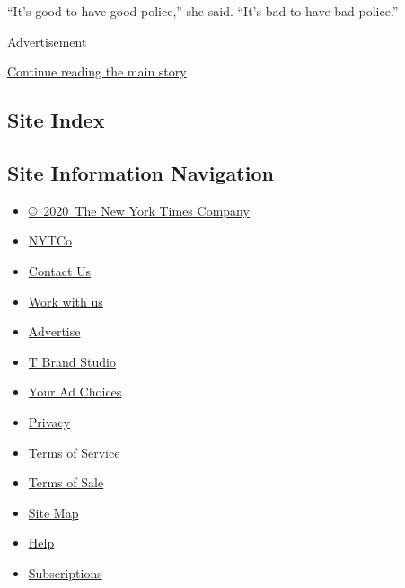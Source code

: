 ``It's good to have good police,'' she said. ``It's bad to have bad
police.''

Advertisement

\protect\hyperlink{after-bottom}{Continue reading the main story}

\hypertarget{site-index}{%
\subsection{Site Index}\label{site-index}}

\hypertarget{site-information-navigation}{%
\subsection{Site Information
Navigation}\label{site-information-navigation}}

\begin{itemize}
\tightlist
\item
  \href{https://help.nytimes3xbfgragh.onion/hc/en-us/articles/115014792127-Copyright-notice}{©~2020~The
  New York Times Company}
\end{itemize}

\begin{itemize}
\tightlist
\item
  \href{https://www.nytco.com/}{NYTCo}
\item
  \href{https://help.nytimes3xbfgragh.onion/hc/en-us/articles/115015385887-Contact-Us}{Contact
  Us}
\item
  \href{https://www.nytco.com/careers/}{Work with us}
\item
  \href{https://nytmediakit.com/}{Advertise}
\item
  \href{http://www.tbrandstudio.com/}{T Brand Studio}
\item
  \href{https://www.nytimes3xbfgragh.onion/privacy/cookie-policy\#how-do-i-manage-trackers}{Your
  Ad Choices}
\item
  \href{https://www.nytimes3xbfgragh.onion/privacy}{Privacy}
\item
  \href{https://help.nytimes3xbfgragh.onion/hc/en-us/articles/115014893428-Terms-of-service}{Terms
  of Service}
\item
  \href{https://help.nytimes3xbfgragh.onion/hc/en-us/articles/115014893968-Terms-of-sale}{Terms
  of Sale}
\item
  \href{https://spiderbites.nytimes3xbfgragh.onion}{Site Map}
\item
  \href{https://help.nytimes3xbfgragh.onion/hc/en-us}{Help}
\item
  \href{https://www.nytimes3xbfgragh.onion/subscription?campaignId=37WXW}{Subscriptions}
\end{itemize}
